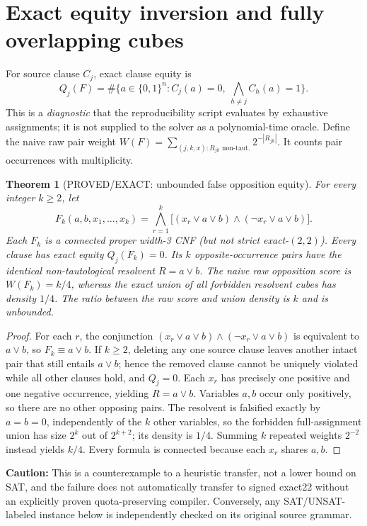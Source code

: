 \documentclass[10pt]{article}
\newtheorem{theorem}{Theorem}
\begin{document}
\section{Exact equity inversion and fully overlapping cubes}
For source clause $C_j$, exact clause equity is
\[
 Q_j(F)=\#\{a\in\{0,1\}^n: C_j(a)=0,\ \bigwedge_{h\ne j}C_h(a)=1\}.
\]
This is a \emph{diagnostic} that the reproducibility script evaluates by exhaustive assignments; it is not supplied to the solver as a polynomial-time oracle. Define the naive raw pair weight $W(F)=\sum_{(j,k,x):R_{jk}\text{ non-taut.}}2^{-|R_{jk}|}$. It counts pair occurrences with multiplicity.
\begin{theorem}[PROVED/EXACT: unbounded false opposition equity]\label{th:dup}
For every integer $k\ge2$, let
\[
 F_k(a,b,x_1,\ldots,x_k)=\bigwedge_{r=1}^{k}\bigl[(x_r\lor a\lor b)\land(\neg x_r\lor a\lor b)\bigr].
\]
Each $F_k$ is a connected proper width-3 CNF (but \emph{not} strict exact-$(2,2)$). Every clause has exact equity $Q_j(F_k)=0$. Its $k$ opposite-occurrence pairs have the identical non-tautological resolvent $R=a\lor b$. The naive raw opposition score is $W(F_k)=k/4$, whereas the exact union of all forbidden resolvent cubes has density $1/4$. The ratio between the raw score and union density is $k$ and is unbounded.
\end{theorem}
\begin{proof}
For each $r$, the conjunction $(x_r\lor a\lor b)\land(\neg x_r\lor a\lor b)$ is equivalent to $a\lor b$, so $F_k\equiv a\lor b$. If $k\ge2$, deleting any one source clause leaves another intact pair that still entails $a\lor b$; hence the removed clause cannot be uniquely violated while all other clauses hold, and $Q_j=0$. Each $x_r$ has precisely one positive and one negative occurrence, yielding $R=a\lor b$. Variables $a,b$ occur only positively, so there are no other opposing pairs. The resolvent is falsified exactly by $a=b=0$, independently of the $k$ other variables, so the forbidden full-assignment union has size $2^k$ out of $2^{k+2}$; its density is $1/4$. Summing $k$ repeated weights $2^{-2}$ instead yields $k/4$. Every formula is connected because each $x_r$ shares $a,b$.
\end{proof}

\noindent\textbf{Caution:} This is a counterexample to a heuristic transfer, not a lower bound on SAT, and the failure does not automatically transfer to signed exact22 without an explicitly proven quota-preserving compiler. Conversely, any SAT/UNSAT-labeled instance below is independently checked on its original source grammar.
\end{document}
